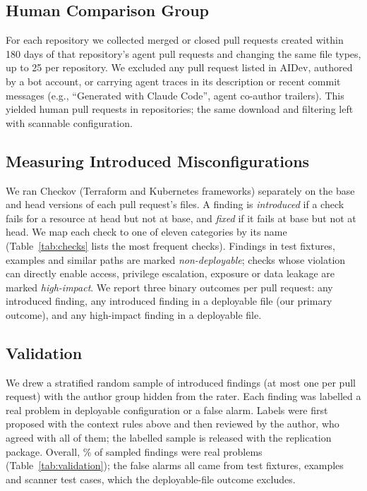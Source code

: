 \documentclass[10pt,conference]{IEEEtran}
\begin{document}
\subsection{Human Comparison Group}
For each repository we collected merged or closed pull requests created within 180 days of that repository's agent pull requests and changing the same file types, up to 25 per repository. We excluded any pull request listed in AIDev, authored by a bot account, or carrying agent traces in its description or recent commit messages (e.g., ``Generated with Claude Code'', agent co-author trailers). This yielded \NhumanCollected{} human pull requests in \NhumanRepos{} repositories; the same download and filtering left \NhumanAll{} with scannable configuration.

\subsection{Measuring Introduced Misconfigurations}
We ran Checkov (Terraform and Kubernetes frameworks) separately on the base and head versions of each pull request's files. A finding is \emph{introduced} if a check fails for a resource at head but not at base, and \emph{fixed} if it fails at base but not at head. We map each check to one of eleven categories by its name (Table~\ref{tab:checks} lists the most frequent checks). Findings in test fixtures, examples and similar paths are marked \emph{non-deployable}; checks whose violation can directly enable access, privilege escalation, exposure or data leakage are marked \emph{high-impact}. We report three binary outcomes per pull request: any introduced finding, any introduced finding in a deployable file (our primary outcome), and any high-impact finding in a deployable file.

\subsection{Validation}\label{sec:validation}
We drew a stratified random sample of \ValN{} introduced findings (at most one per pull request) with the author group hidden from the rater. Each finding was labelled a real problem in deployable configuration or a false alarm. Labels were first proposed with the context rules above and then reviewed by the author, who agreed with all of them; the labelled sample is released with the replication package. Overall, \ValPrec\% of sampled findings were real problems (Table~\ref{tab:validation}); the \ValFPtest{} false alarms all came from test fixtures, examples and scanner test cases, which the deployable-file outcome excludes.
\end{document}
